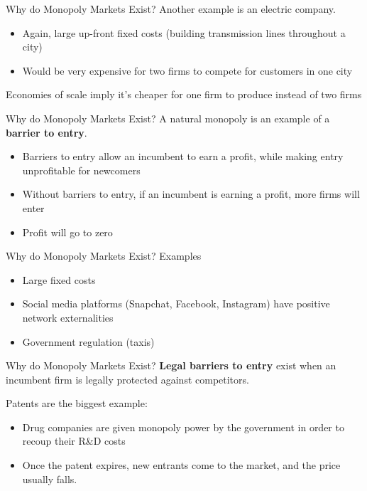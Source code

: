 \documentclass[11pt,t]{beamer}
\begin{document}
\begin{frame}{Why do Monopoly Markets Exist?}
  Another example is an electric company.

  \begin{itemize}
    \item Again, large up-front fixed costs (building transmission lines throughout a city)
    \item Would be very expensive for two firms to compete for customers in one city
  \end{itemize}

  \bigskip
  Economies of scale imply it's cheaper for one firm to produce instead of two firms
\end{frame}

\begin{frame}{Why do Monopoly Markets Exist?}
  A natural monopoly is an example of a \textbf{barrier to entry}.
  
  \begin{itemize}
    \item Barriers to entry allow an incumbent to earn a profit, while making entry unprofitable for newcomers
    \item Without barriers to entry, if an incumbent is earning a profit, more firms will enter
    \item Profit will go to zero
  \end{itemize}
\end{frame}

\begin{frame}{Why do Monopoly Markets Exist?}
  Examples

  \begin{itemize}
    \item Large fixed costs 
    \item Social media platforms (Snapchat, Facebook, Instagram) have positive network externalities
    \item Government regulation (taxis)
  \end{itemize}
\end{frame}

\begin{frame}{Why do Monopoly Markets Exist?}
  \textbf{Legal barriers to entry} exist when an incumbent firm is legally protected against competitors.

  \bigskip
  Patents are the biggest example:

  \begin{itemize}
    \item Drug companies are given monopoly power by the government in order to recoup their R\&D costs
    \item Once the patent expires, new entrants come to the market, and the price usually falls.
  \end{itemize}
\end{frame}
\end{document}
